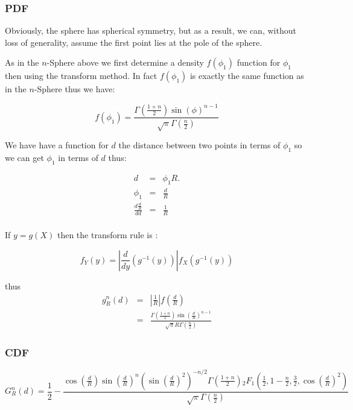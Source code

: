 \subsubsection{PDF}

Obviously, the sphere has spherical symmetry, but as a result, we can,
without loss of generality, assume the first point lies at the pole of
the sphere.

As in the $n$-Sphere above we first determine a density $f(\phi_1)$ function for $\phi_1$ then using the transform method. In fact $f(\phi_1)$ is exactly the same function as in the  $n$-Sphere thus we have:

\begin{equation}  
 f(\phi_1) = \frac{\Gamma\left(\frac{1+n}{2}\right) \sin(\phi )^{n - 1}}{\sqrt{\pi } \Gamma\left(\frac{n}{2}\right)}
\end{equation} 

We have have a function for $d$ the distance between two points in terms of $\phi_1$ so we can get  $\phi_1$ in terms of $d$ thus:

\begin{eqnarray}
  d & = & \phi_1  R.\\
\phi_1& = & \frac{d}{R}\\ 
   \frac {d \frac{d}{R}}{dd} & = & \frac{1}{R}\\
\end{eqnarray}



If $y = g(X)$ then the transform rule  is :  

\[ f_Y(y) = \left| \frac{d}{dy} \left( g^{-1}(y) \right) \right|
                f_X\left( g^{-1}(y) \right)
\]

thus 
\begin{eqnarray}
g_{R}^{n}(d) & = &  \left|\frac{1}{R}\right|  f\left(\frac{d}{R} \right)\\
            & = &   \frac{\Gamma\left(\frac{1+n}{2}\right) 
                            \sin\left(\frac{d}{R}\right)^{n-1}}
                        {\sqrt{\pi } R \Gamma\left(\frac{n}{2}\right)}
\end{eqnarray}



\subsubsection{CDF}
\begin{equation}
G_{R}^{n}(d)=\frac{1}{2}-\frac{\cos\left(\frac{d}{R}\right) \sin\left(\frac{d}{R}\right)^n \left(\sin\left(\frac{d}{R}\right)^2\right)^{-n/2}\Gamma\left(\frac{1+n}{2}\right) {}_{2}F_{1}\left(\frac{1}{2},1-\frac{n}{2},\frac{3}{2},\cos\left(\frac{d}{R}\right)^2\right) }  {\sqrt{\pi } \Gamma\left(\frac{n}{2}\right)}
\end{equation}

